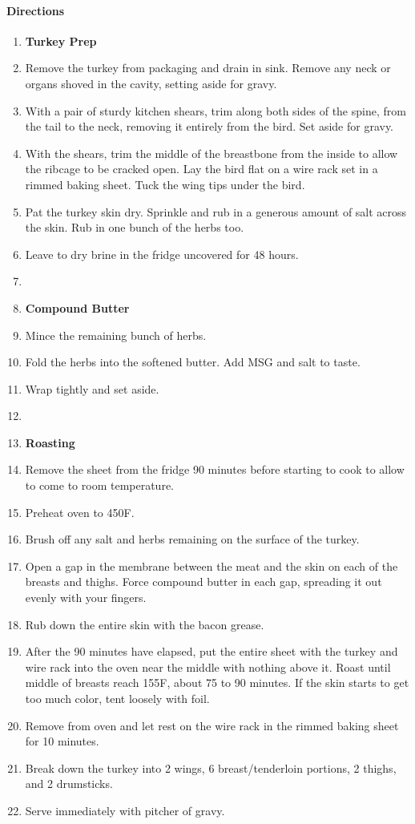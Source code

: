 \documentclass[12pt]{article}
\newenvironment*{directions}
	{
		\paragraph*{Directions}
		\begin{enumerate}
	}
	{
		\end{enumerate}
	}
\begin{document}
	\begin{directions}
		\item[] \textbf{Turkey Prep}
		\item Remove the turkey from packaging and drain in sink. Remove any neck or organs shoved in the cavity, setting aside for gravy.
		\item With a pair of sturdy kitchen shears, trim along both sides of the spine, from the tail to the neck, removing it entirely from the bird. Set aside for gravy.
		\item With the shears, trim the middle of the breastbone from the inside to allow the ribcage to be cracked open. Lay the bird flat on a wire rack set in a rimmed baking sheet. Tuck the wing tips under the bird.
		\item Pat the turkey skin dry. Sprinkle and rub in a generous amount of salt across the skin. Rub in one bunch of the herbs too.
		\item Leave to dry brine in the fridge uncovered for 48 hours.
		\item[] \hfill
		\item[] \textbf{Compound Butter}
		\item Mince the remaining bunch of herbs.
		\item Fold the herbs into the softened butter. Add MSG and salt to taste.
		\item Wrap tightly and set aside. \label{make_ahead:whole_turkey}
		\item[] \hfill
		\item[] \textbf{Roasting}
		\item Remove the sheet from the fridge 90 minutes before starting to cook to allow to come to room temperature.
		\item Preheat oven to 450F.
		\item Brush off any salt and herbs remaining on the surface of the turkey.
		\item Open a gap in the membrane between the meat and the skin on each of the breasts and thighs. Force compound butter in each gap, spreading it out evenly with your fingers.
		\item Rub down the entire skin with the bacon grease.
		\item After the 90 minutes have elapsed, put the entire sheet with the turkey and wire rack into the oven near the middle with nothing above it. Roast until middle of breasts reach 155F, about 75 to 90 minutes. If the skin starts to get too much color, tent loosely with foil.
		\item Remove from oven and let rest on the wire rack in the rimmed baking sheet for 10 minutes.
		\item Break down the turkey into 2 wings, 6 breast/tenderloin portions, 2 thighs, and 2 drumsticks.
		\item Serve immediately with pitcher of gravy.
	\end{directions}
	
\end{document}
